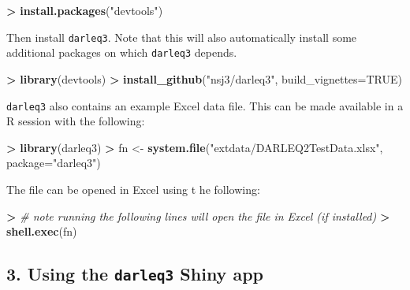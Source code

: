 \documentclass[]{article}
\newenvironment{Shaded}{\begin{snugshade}}{\end{snugshade}}
\newcommand{\CommentTok}[1]{\textcolor[rgb]{0.56,0.35,0.01}{\textit{#1}}}
\newcommand{\DataTypeTok}[1]{\textcolor[rgb]{0.13,0.29,0.53}{#1}}
\newcommand{\ErrorTok}[1]{\textcolor[rgb]{0.64,0.00,0.00}{\textbf{#1}}}
\newcommand{\KeywordTok}[1]{\textcolor[rgb]{0.13,0.29,0.53}{\textbf{#1}}}
\newcommand{\NormalTok}[1]{#1}
\newcommand{\OperatorTok}[1]{\textcolor[rgb]{0.81,0.36,0.00}{\textbf{#1}}}
\newcommand{\OtherTok}[1]{\textcolor[rgb]{0.56,0.35,0.01}{#1}}
\newcommand{\StringTok}[1]{\textcolor[rgb]{0.31,0.60,0.02}{#1}}
\begin{document}
\begin{Shaded}
\begin{Highlighting}[]
\OperatorTok{>}\StringTok{ }\KeywordTok{install.packages}\NormalTok{(}\StringTok{"devtools"}\NormalTok{)}
\end{Highlighting}
\end{Shaded}

Then install \texttt{darleq3}. Note that this will also automatically
install some additional packages on which \texttt{darleq3} depends.

\begin{Shaded}
\begin{Highlighting}[]
\OperatorTok{>}\StringTok{ }\KeywordTok{library}\NormalTok{(devtools)}
\OperatorTok{>}\StringTok{ }\KeywordTok{install_github}\NormalTok{(}\StringTok{"nsj3/darleq3"}\NormalTok{, }\DataTypeTok{build_vignettes=}\OtherTok{TRUE}\NormalTok{)}
\end{Highlighting}
\end{Shaded}

\texttt{darleq3} also contains an example Excel data file. This can be
made available in a R session with the following:

\begin{Shaded}
\begin{Highlighting}[]
\OperatorTok{>}\StringTok{ }\KeywordTok{library}\NormalTok{(darleq3)}
\OperatorTok{>}\StringTok{ }\NormalTok{fn <-}\StringTok{ }\KeywordTok{system.file}\NormalTok{(}\StringTok{"extdata/DARLEQ2TestData.xlsx"}\NormalTok{, }\DataTypeTok{package=}\StringTok{"darleq3"}\NormalTok{)}
\end{Highlighting}
\end{Shaded}

The file can be opened in Excel using t he following:

\begin{Shaded}
\begin{Highlighting}[]
\OperatorTok{>}\StringTok{ }\CommentTok{# note running the following lines will open the file in Excel (if installed)}
\ErrorTok{>}\StringTok{ }\KeywordTok{shell.exec}\NormalTok{(fn)}
\end{Highlighting}
\end{Shaded}

\hypertarget{using-the-darleq3-shiny-app}{%
\subsection{\texorpdfstring{3. Using the \texttt{darleq3} Shiny
app}{3. Using the darleq3 Shiny app}}\label{using-the-darleq3-shiny-app}}
\end{document}
